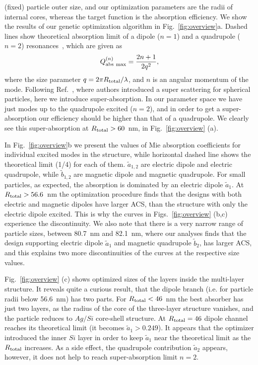 \documentclass[aps,prl,twocolumn,showpacs,superscriptaddress,groupedaddress]{revtex4-1}
\begin{document}
(fixed) particle outer size, and our optimization parameters are the
radii of internal cores, whereas the target function is the absorption
efficiency.  We show the results of our genetic optimization algorithm
in Fig.~\ref{fig:overview}a.  Dashed lines show theoretical absorption
limit of a dipole ($n=1$) and a quadrupole ($n=2$)
resonances~\cite{Tribelsky-2011}, which are given as $$Q^{(n)}_{\rm
  abs\ max}=\frac{2n+1}{2q^2},$$ where the size parameter $q=2\pi
R_{\rm total}/\lambda$, and $n$ is an angular momentum of the
mode. Following Ref.~\cite{Fan-2011}, where authors introduced a super
scattering for spherical particles, here we introduce
super-absorption. In our parameter space we have just modes up to the
quadrupole excited ($n=2$), and in order to get a super-absorption our
efficiency should be higher than that of a quadrupole. We clearly see
this super-absorption at $R_{\rm total}>60$~nm, in
Fig.~\ref{fig:overview} (a).

In Fig.~\ref{fig:overview}b we present the values of Mie absorption
coefficients for individual excited modes in the structure, while
horizontal dashed line shows the theoretical limit (1/4) for each of
them. $\tilde{a}_{1,2}$ are electric dipole and electric quadrupole,
while $\tilde{b}_{1,2}$ are magnetic dipole and magnetic
quadrupole. For small particles, as expected, the absorption is
dominated by an electric dipole $\tilde{a}_1$.  At $R_{\rm total} >
56.6$~nm the optimization procedure finds that the designs with both
electric and magnetic dipoles have larger ACS, than the structure with
only the electric dipole excited. This is why the curves in
Figs.~\ref{fig:overview} (b,c) experience the discontinuity. We also
note that there is a very narrow range of particle sizes, between
80.7~nm and 82.1~nm, where our analyses finds that the design
supporting electric dipole $\tilde{a}_1$ and magnetic quadrupole
$\tilde{b}_2$, has larger ACS, and this explains two more
discontinuities of the curves at the respective size values.

Fig.~\ref{fig:overview} (c) shows optimized sizes of the layers inside
the multi-layer structure. It reveals quite a curious result, that the
dipole branch (i.e. for particle radii below 56.6~nm) has two
parts. For $R_{\rm total}<46$~nm the best absorber has just two
layers, as the radius of the core of the three-layer structure
vanishes, and the particle reduces to $Ag/Si$ core-shell structure.
At $R_{\rm total}=46$ dipole channel reaches its theoretical limit (it
becomes $\tilde{a}_1>0.249$).  It appears that the optimizer
introduced the inner $Si$ layer in order to keep $\tilde{a}_1$ near
the theoretical limit as the $R_{\rm total}$ increases.  As a side
effect, the quadrupole contribution $\tilde{a}_2$ appears, however, it
does not help to reach super-absorption limit $n=2$.
\end{document}
